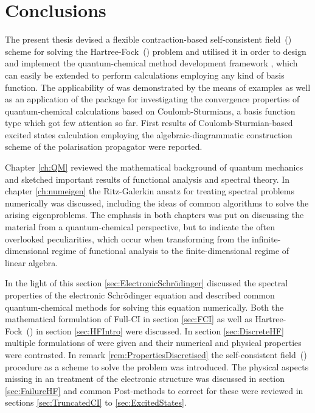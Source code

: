 \chapter{Conclusions}
\label{ch:Conclusion}

\noindent
The present thesis devised a flexible contraction-based self-consistent field~(\SCF)
scheme for solving the Hartree-Fock~(\HF) problem
and utilised it in order to design and implement the
quantum-chemical method development framework \molsturm,
which can easily be extended to perform calculations
employing any kind of basis function.
The applicability of \molsturm was demonstrated by the means
of examples as well as an application of the package for
investigating the convergence properties
of quantum-chemical calculations
based on Coulomb-Sturmians,
a basis function type which got few attention so far.
First results of Coulomb-Sturmian-based excited states
calculation employing the algebraic-diagrammatic construction scheme
of the polarisation propagator were reported.


Chapter \ref{ch:QM} reviewed the mathematical background of quantum mechanics
and sketched important results of functional analysis
and spectral theory.
In chapter \ref{ch:numeigen} the Ritz-Galerkin ansatz
for treating spectral problems numerically
was discussed, including the ideas of common algorithms
to solve the arising eigenproblems.
The emphasis in both chapters
was put on discussing the material from a quantum-chemical perspective,
but to indicate the often overlooked peculiarities,
which occur when transforming from the infinite-dimensional regime
of functional analysis to the finite-dimensional regime of linear algebra.


In the light of this section \ref{sec:ElectronicSchrödinger}
discussed the spectral properties
of the electronic Schrödinger equation and
described common quantum-chemical methods
for solving this equation numerically.
Both the mathematical formulation of Full-CI in section \ref{sec:FCI}
as well as Hartree-Fock~(\HF) in section \ref{sec:HFIntro} were discussed.
In section \ref{sec:DiscreteHF} multiple formulations of \HF were given
and their numerical and physical properties were contrasted.
In remark \ref{rem:PropertiesDiscretised}
the self-consistent field~(\SCF) procedure
as a scheme to solve the \HF problem was introduced.
The physical aspects missing in an \HF treatment of the electronic
structure was discussed in section \ref{sec:FailureHF}
and common Post-\HF methods to correct for these were
reviewed in sections \ref{sec:TruncatedCI} to \ref{sec:ExcitedStates}.

